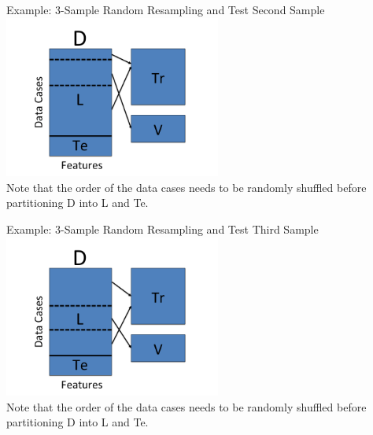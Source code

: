 \documentclass[serif,xcolor=pdftex,dvipsnames,table,hyperref={bookmarks=false}]{beamer}
\begin{document}
\begin{frame}[t]{Example: 3-Sample Random Resampling and Test}
\center
Second Sample\\
\includegraphics[width=2.8in]{../Figures/model-selection-rr-te-2.png}\\
Note that the order of the data cases needs to be randomly
shuffled before partitioning D into L and Te. 
\end{frame}

\begin{frame}[t]{Example: 3-Sample Random Resampling and Test}
\center
Third Sample\\
\includegraphics[width=2.8in]{../Figures/model-selection-rr-te-3.png}\\
Note that the order of the data cases needs to be randomly
shuffled before partitioning D into L and Te. 
\end{frame}
\end{document}
